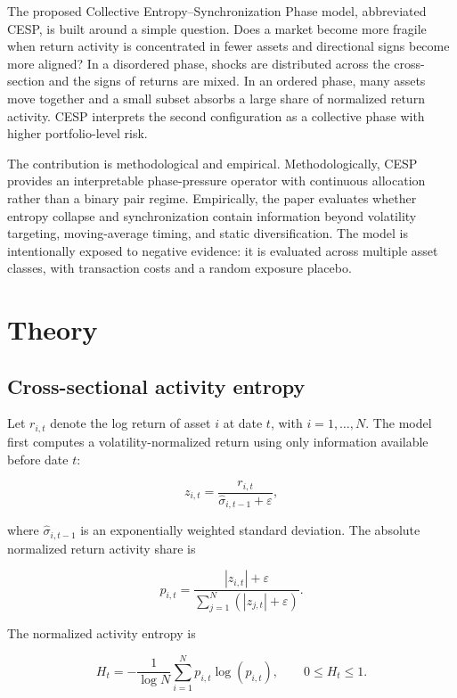 \documentclass[11pt]{article}
\begin{document}
The proposed Collective Entropy--Synchronization Phase model, abbreviated CESP,
is built around a simple question. Does a market become more fragile when return
activity is concentrated in fewer assets and directional signs become more aligned?
In a disordered phase, shocks are distributed across the cross-section and the signs
of returns are mixed. In an ordered phase, many assets move together and a small
subset absorbs a large share of normalized return activity. CESP interprets the second
configuration as a collective phase with higher portfolio-level risk.

The contribution is methodological and empirical. Methodologically, CESP provides
an interpretable phase-pressure operator with continuous allocation rather than a
binary pair regime. Empirically, the paper evaluates whether entropy collapse and
synchronization contain information beyond volatility targeting, moving-average timing,
and static diversification. The model is intentionally exposed to negative evidence:
it is evaluated across multiple asset classes, with transaction costs and a random
exposure placebo.

\section{Theory}

\subsection{Cross-sectional activity entropy}

Let $r_{i,t}$ denote the log return of asset $i$ at date $t$, with $i=1,\ldots,N$.
The model first computes a volatility-normalized return using only information
available before date $t$:

\begin{equation}
z_{i,t}=\frac{r_{i,t}}{\widehat{\sigma}_{i,t-1}+\varepsilon},
\end{equation}

where $\widehat{\sigma}_{i,t-1}$ is an exponentially weighted standard deviation.
The absolute normalized return activity share is

\begin{equation}
p_{i,t}=
\frac{|z_{i,t}|+\varepsilon}
{\sum_{j=1}^{N}(|z_{j,t}|+\varepsilon)}.
\end{equation}

The normalized activity entropy is

\begin{equation}
H_t=
-\frac{1}{\log N}
\sum_{i=1}^{N}p_{i,t}\log(p_{i,t}),
\qquad 0\leq H_t\leq 1.
\end{equation}
\end{document}

